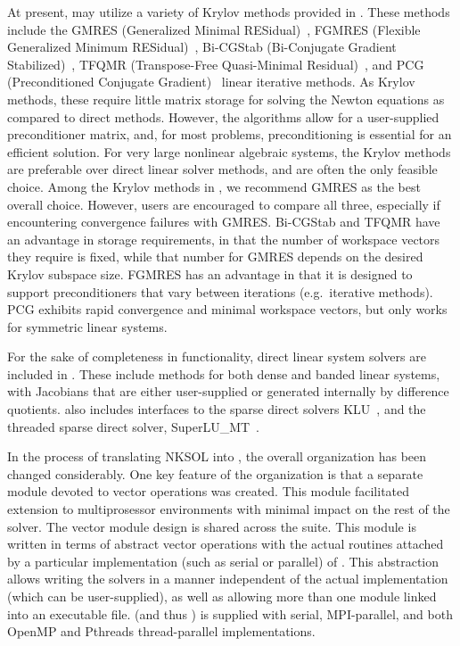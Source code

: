 At present, {\kinsol} may utilize a variety of Krylov methods provided
in {\sundials}. These methods include the 
GMRES (Generalized Minimal RESidual)~\cite{SaSc:86},
FGMRES (Flexible Generalized Minimum RESidual)~\cite{Saa:93},
Bi-CGStab (Bi-Conjugate Gradient Stabilized)~\cite{Van:92}, TFQMR
(Transpose-Free Quasi-Minimal Residual)~\cite{Fre:93}, and PCG
(Preconditioned Conjugate Gradient)~\cite{HeSt:52} linear iterative
methods.  As Krylov methods, these require little  
matrix storage for solving the Newton equations as compared to direct 
methods. However, the algorithms allow for a user-supplied preconditioner
matrix, and, for most problems, preconditioning is essential for an
efficient solution.  For very large nonlinear algebraic systems,
the Krylov methods are preferable over direct linear solver methods,
and are often the only feasible choice. Among the Krylov
methods in {\sundials}, we recommend GMRES as the best overall
choice. However, users are encouraged to compare all three,
especially if encountering convergence failures with GMRES.
Bi-CGStab and TFQMR have an advantage in storage requirements,
in that the number of workspace vectors they require is fixed,
while that number for GMRES depends on the desired Krylov
subspace size.   FGMRES
has an advantage in that it is designed to support preconditioners
that vary between iterations (e.g.~iterative methods).  PCG exhibits
rapid convergence and minimal workspace vectors, but only works for
symmetric linear systems.

For the sake of completeness in functionality, direct linear
system solvers are included in {\kinsol}.  These include methods
for both dense and banded linear systems, with Jacobians that
are either user-supplied or generated internally by difference
quotients.  {\kinsol} also includes interfaces to the sparse 
direct solvers KLU~\cite{DaPa:10,KLU_site}, 
and the threaded sparse direct solver,
SuperLU\_MT~\cite{Li:05,DGL:99,SuperLUMT_site}.

In the process of translating NKSOL into {\CC}, the overall
{\kinsol} organization has been changed considerably. One key
feature of the {\kinsol} organization is that a separate module
devoted to vector operations was created.  This module
facilitated extension to multiprosessor environments with minimal
impact on the rest of the solver. The vector module design is
shared across the {\sundials} suite. This {\nvector} module is
written in terms of abstract vector operations with the actual
routines attached by a particular implementation (such as serial
or parallel) of {\nvector}. This abstraction allows writing the {\sundials}
solvers in a manner independent of the actual {\nvector}
implementation (which can be user-supplied), as well as allowing
more than one {\nvector} module linked into an executable file.
{\sundials} (and thus {\kinsol}) is supplied with serial, 
MPI-parallel, and both OpenMP and Pthreads thread-parallel
{\nvector} implementations.

